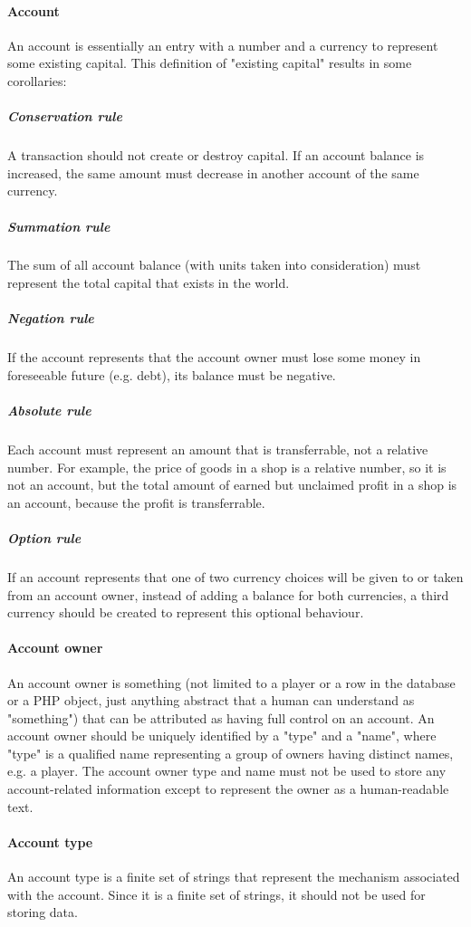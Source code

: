 \documentclass{report}
\begin{document}
			\paragraph{Account}
				An account is essentially an entry with a number and a currency to represent some existing capital.
				This definition of "existing capital" results in some corollaries:
				\subparagraph{Conservation rule} A transaction should not create or destroy capital.
					If an account balance is increased, the same amount must decrease in another account of the same currency.
				\subparagraph{Summation rule} The sum of all account balance (with units taken into consideration) must represent the total capital that exists in the world.
				\subparagraph{Negation rule} If the account represents that the account owner must lose some money in foreseeable future (e.g. debt), its balance must be negative.
				\subparagraph{Absolute rule} Each account must represent an amount that is transferrable, not a relative number.
					For example, the price of goods in a shop is a relative number, so it is not an account,
					but the total amount of earned but unclaimed profit in a shop is an account, because the profit is transferrable.
				\subparagraph{Option rule} If an account represents that one of two currency choices will be given to or taken from an account owner,
					instead of adding a balance for both currencies, a third currency should be created to represent this optional behaviour.

			\paragraph{Account owner}
				An account owner is something (not limited to a player or a row in the database or a PHP object,
				just anything abstract that a human can understand as "something") that can be attributed as having full control on an account.
				An account owner should be uniquely identified by a "type" and a "name",
				where "type" is a qualified name representing a group of owners having distinct names, e.g. a player.
				The account owner type and name must not be used to store any account-related information except to represent the owner as a human-readable text.

			\paragraph{Account type}
				An account type is a finite set of strings that represent the mechanism associated with the account.
				Since it is a finite set of strings, it should not be used for storing data.
\end{document}
